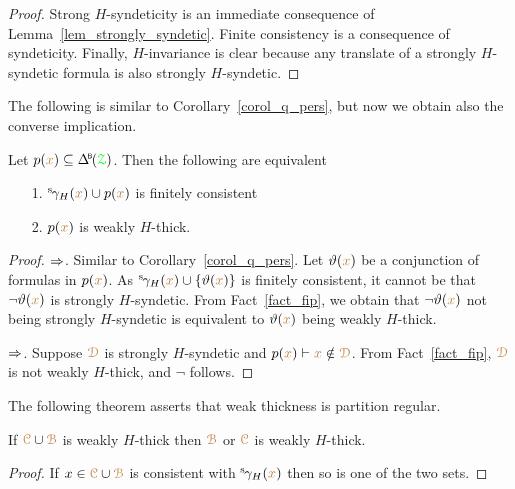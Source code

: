 \begin{proof}
  Strong $H$-syndeticity is an immediate consequence of Lemma~\ref{lem_strongly_syndetic}.
  Finite consistency is a consequence of syndeticity.
  Finally, $H$-invariance is clear because any translate of a strongly $H$-syndetic formula is also strongly $H$-syndetic.
\end{proof}

The following is similar to Corollary~\ref{corol_q_pers}, but now we obtain also the converse implication.

\begin{corollary}\label{corol_q_w_pers}
  Let $p({\mr x})\subseteq\BDelta(\grZ)$.
  Then the following are equivalent
  \begin{itemize}
    \item [1.] ${}^{\rm s}\kern-.2ex\gamma_H({\color{brown} x})\cup p({\color{brown} x})$ is finitely consistent
    \item [2.] $p({\color{brown} x})$ is weakly $H$-thick.
  \end{itemize}
\end{corollary}

\begin{proof}
  $\Rightarrow$. 
  Similar to Corollary~\ref{corol_q_pers}.
  Let $\vartheta({\color{brown} x})$ be a conjunction of formulas in $p({\color{brown} x})$.
  As ${}^{\rm s}\kern-.2ex\gamma_H({\color{brown} x})\cup\{\vartheta({\color{brown} x})\}$ is finitely consistent, it cannot be that $\neg\vartheta({\color{brown} x})$ is strongly $H$-syndetic.
  From Fact~\ref{fact_fip}, we obtain that $\neg\vartheta({\color{brown} x})$ not being strongly $H$-syndetic is equivalent to $\vartheta({\color{brown} x})$ being weakly $H$-thick.

  $\Rightarrow$. 
  Suppose ${\color{brown}\EuScript D}$ is strongly $H$-syndetic and $p({\color{brown} x})\vdash{\color{brown}x}\notin{\color{brown}\EuScript D}$.
  From Fact~\ref{fact_fip}, ${\color{brown}\EuScript D}$ is not weakly $H$-thick, and $\neg$ follows.
\end{proof}

The following theorem asserts that weak thickness is partition regular.

\begin{theorem}\label{thm_wt_partreg}
  If ${\color{brown}\EuScript C}\cup{\color{brown}\EuScript B}$ is weakly $H$-thick then ${\color{brown}\EuScript B}$ or ${\color{brown}\EuScript C}$ is weakly $H$-thick.
\end{theorem}

\begin{proof}
  If $x\in {\color{brown}\EuScript C}\cup{\color{brown}\EuScript B}$ is consistent with ${}^{\rm s}\kern-.2ex\gamma_H({\color{brown} x})$ then so is one of the two sets.
\end{proof}

